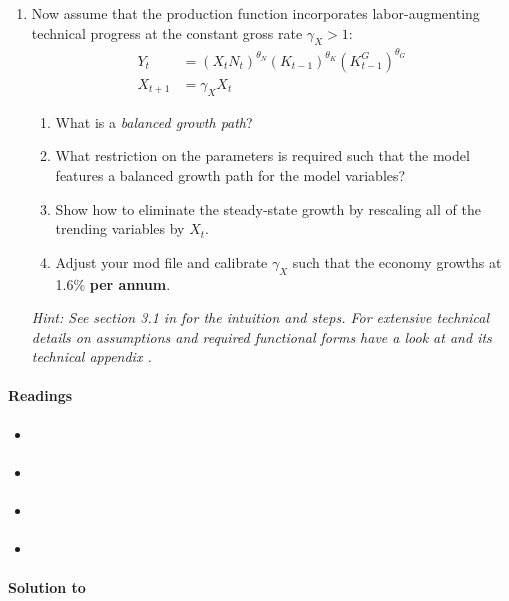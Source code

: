 \begin{enumerate}
\item Now assume that the production function incorporates labor-augmenting technical progress at the constant gross rate $\gamma_X>1$:
\begin{align}
  Y_t &= (X_t N_t)^{\theta_N} (K_{t-1})^{\theta_K} (K_{t-1}^G)^{\theta_G} \label{eq:BaxterKing:ProductionFunctionGrowth}
  \\
  X_{t+1} &= \gamma_X X_t \nonumber
\end{align}
  \begin{enumerate}
  \item What is a \emph{balanced growth path}?
  \item What restriction on the parameters is required such that the model features a balanced growth path for the model variables?
  \item Show how to eliminate the steady-state growth by rescaling all of the trending variables by $X_t$.
  \item Adjust your mod file and calibrate $\gamma_X$ such that the economy growths at 1.6\% \textbf{per annum}.
  \end{enumerate}
\emph{Hint: See section 3.1 in \textcite{King.Rebelo_1999_ResuscitatingRealBusiness} for the intuition and steps.
For extensive technical details on assumptions and required functional forms have a look at \textcite{King.Plosser.Rebelo_1988_ProductionGrowthBusiness}
  and its technical appendix \textcite{King.Plosser.Rebelo_2002_ProductionGrowthBusiness}. }
\end{enumerate}

\paragraph{Readings}
\begin{itemize}
\item \textcite{Baxter.King_1993_FiscalPolicyGeneral}
\item \textcite{King.Rebelo_1999_ResuscitatingRealBusiness}
\item \textcite{King.Plosser.Rebelo_1988_ProductionGrowthBusiness}
\item \textcite{King.Plosser.Rebelo_2002_ProductionGrowthBusiness}
\end{itemize}

\begin{solution}\textbf{Solution to }
\ifDisplaySolutions

\fi
\newpage
\end{solution}